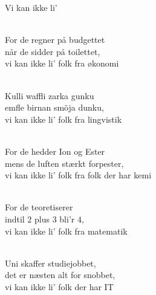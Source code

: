\begin{song}{Vi kan ikke li'}

  \begin{SBVerse}
    \\
    For de regner på budgettet\\
    når de sidder på toilettet,\\
    vi kan ikke li' folk fra økonomi
  \end{SBVerse}

  \begin{SBVerse}
    \\
    Kulli waffli zarka gunku\\
    emfle birnan smöja dunku,\\
    vi kan ikke li' folk fra lingvistik
  \end{SBVerse}

  \begin{SBVerse}
    \\
    For de hedder Ion og Ester\\
    mens de luften stærkt forpester,\\
    vi kan ikke li' folk fra folk der har kemi
  \end{SBVerse}

 \begin{SBVerse}
    \\
    For de teoretiserer\\
    indtil $2$ plus $3$ bli'r $4$,\\
    vi kan ikke li' folk fra matematik
  \end{SBVerse}

\begin{SBVerse}
    \\
    Uni skaffer studiejobbet,\\
    det er næsten alt for snobbet,\\
    vi kan ikke li' folk der har IT
 \end{SBVerse}


\end{song}
